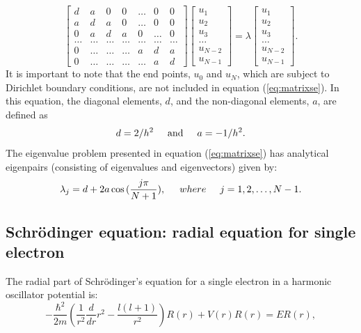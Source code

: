 \documentclass[12pt, a4paper, reqno, article]{amsart}
\newcommand{\hbarm}{-\frac{\hbar^{2}}{2m}}
\newcommand{\ortwo}{\frac{1}{r^{2}}}
\newcommand{\ddr}{\frac{d}{dr}}
\begin{document}
\begin{equation}
    \begin{bmatrix} d& a & 0   & 0    & \dots  &0     & 0 \\
                                a & d & a & 0    & \dots  &0     &0 \\
                                0   & a & d & a  &0       &\dots & 0\\
                                \dots  & \dots & \dots & \dots  &\dots      &\dots & \dots\\
                                0   & \dots & \dots & \dots  &a  &d & a\\
                                0   & \dots & \dots & \dots  &\dots       &a & d\end{bmatrix}
                                 \begin{bmatrix} u_1 \\ u_2 \\ u_3 \\ \dots \\ u_{N-2} \\ u_{N-1}\end{bmatrix} = \lambda \begin{bmatrix} u_1 \\ u_2 \\ u_3 \\ \dots \\ u_{N-2} \\ u_{N-1}\end{bmatrix}.
\label{eq:matrixse}
\end{equation}
It is important to note that the end points, $u_0$ and $u_N$, which are subject to Dirichlet boundary conditions, are not included in equation (\ref{eq:matrixse}). In this equation, the diagonal elements, $d$, and the non-diagonal elements, $a$, are defined as
\[
d=2/h^2 \hspace{0.5cm} \textrm{and} \hspace{0.5cm} a=-1/h^2.
\]
 The eigenvalue problem presented in equation (\ref{eq:matrixse}) has analytical eigenpairs (consisting of eigenvalues and eigenvectors) given by:
\begin{equation}
\lambda_j = d+2a\cos{(\frac{j\pi}{N+1})}, \hspace{0.5cm} where \hspace{0.5cm} j=1,2,\dots, N-1.
\end{equation}
\subsection{Schrödinger equation: radial equation for single electron}
The radial part of Schrödinger's equation for a single electron in a harmonic oscillator potential is:
\begin{equation}
	\hbarm	(\ortwo \ddr r^{2} - \frac{l(l+1)}{r^{2}}) R(r) + V(r)R(r) = E R(r),
\label{eq:schrodinger}
\end{equation}
\end{document}
